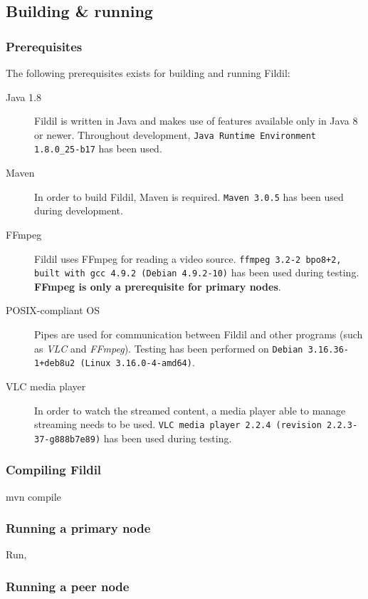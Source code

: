 \documentclass[10pt, a4paper]{article}
\begin{document}
\subsection{Building \& running}

\subsubsection{Prerequisites}

The following prerequisites exists for building and running Fildil:

\begin{description}
\item[Java 1.8] Fildil is written in Java and makes use of features available
  only in Java 8 or newer. Throughout development, \texttt{Java Runtime
    Environment 1.8.0\_25-b17} has been used.
\item[Maven] In order to build Fildil, Maven is required. \texttt{Maven 3.0.5}
  has been used during development.
\item[FFmpeg] Fildil uses FFmpeg for reading a video source. \texttt{ffmpeg
    3.2-2~bpo8+2, built with gcc 4.9.2 (Debian 4.9.2-10)} has been used
  during testing. \textbf{FFmpeg is only a prerequisite for primary nodes}.
\item[POSIX-compliant OS] Pipes are used for communication between Fildil and
  other programs (such as \emph{VLC} and \emph{FFmpeg}). Testing has been
  performed on \texttt{Debian 3.16.36-1+deb8u2 (Linux 3.16.0-4-amd64)}.
\item[VLC media player] In order to watch the streamed content, a media player
  able to manage streaming needs to be used. \texttt{VLC media player 2.2.4
    (revision 2.2.3-37-g888b7e89)} has been used during testing.
\end{description}

\subsubsection{Compiling Fildil}

mvn compile

\subsubsection{Running a primary node}

Run,

\subsubsection{Running a peer node}
\end{document}
